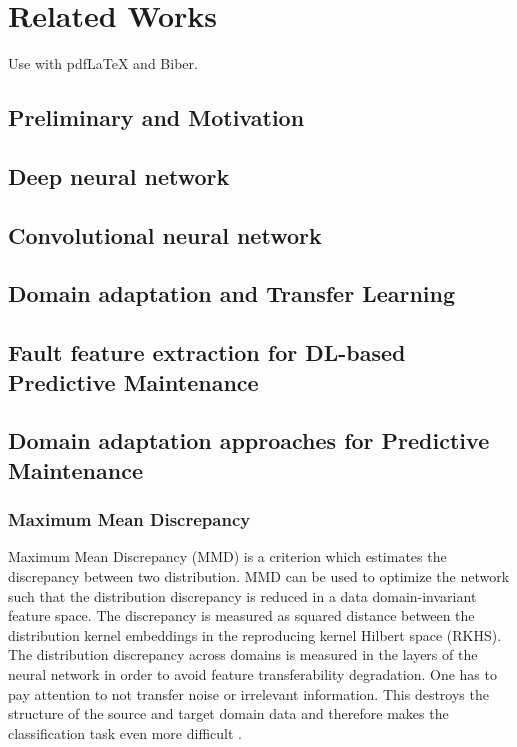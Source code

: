 
\chapter{Related Works}\label{chapter:introduction}
Use with pdfLaTeX and Biber.

\section{Preliminary and Motivation}
\section{Deep neural network}
\section{Convolutional neural network}
\section{Domain adaptation and Transfer Learning}
\section{Fault feature extraction for DL-based Predictive Maintenance}
\section{Domain adaptation approaches for Predictive Maintenance}
\subsection{Maximum Mean Discrepancy}
Maximum Mean Discrepancy (MMD) is a criterion which estimates the discrepancy between two distribution. MMD can be used to optimize the network such that the distribution discrepancy is reduced in a data domain-invariant feature space. The discrepancy is measured as squared distance between the distribution kernel embeddings in the reproducing kernel Hilbert space (RKHS). The distribution discrepancy across domains is measured in the layers of the neural network in order to avoid feature transferability degradation. One has to pay attention to not transfer noise or irrelevant information. This destroys the structure of the source and target domain data and therefore makes the classification task even more difficult \cite{li2020domain}. 

